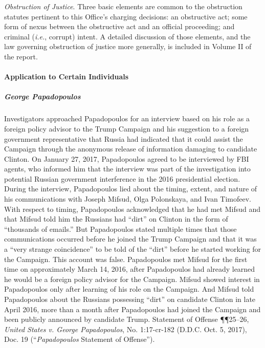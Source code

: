 \textit{Obstruction of Justice}.
Three basic elements are common to the obstruction statutes pertinent to this Office's charging decisions: an obstructive act; some form of nexus between the obstructive act and an official proceeding; and criminal (\textit{i.e.}, corrupt) intent.
A detailed discussion of those elements, and the law governing obstruction of justice more generally, is included in Volume II of the report.

\paragraph{Application to Certain Individuals}

\subparagraph{George Papadopoulos}
Investigators approached Papadopoulos for an interview based on his role as a foreign policy advisor to the Trump Campaign and his suggestion to a foreign government representative that Russia had indicated that it could assist the Campaign through the anonymous release of information damaging to candidate Clinton.
On January 27, 2017, Papadopoulos agreed to be interviewed by FBI agents, who informed him that the interview was part of the investigation into potential Russian government interference in the 2016 presidential election.
During the interview, Papadopoulos lied about the timing, extent, and nature of his communications with Joseph Mifsud, Olga Polonskaya, and Ivan Timofeev.
With respect to timing, Papadopoulos acknowledged that he had met Mifsud and that Mifsud told him the Russians had ``dirt'' on Clinton in the form of ``thousands of emails.''
But Papadopoulos stated multiple times that those communications occurred before he joined the Trump Campaign and that it was a ``very strange coincidence'' to be told of the ``dirt'' before he started working for the Campaign.
This account was false.
Papadopoulos met Mifsud for the first time on approximately March 14, 2016, after Papadopoulos had already learned he would be a foreign policy advisor for the Campaign.
Mifsud showed interest in Papadopoulos only after learning of his role on the Campaign.
And Mifsud told Papadopoulos about the Russians possessing ``dirt'' on candidate Clinton in late April 2016, more than a month after Papadopoulos had joined the Campaign and been publicly announced by candidate Trump.
Statement of Offense \P\P 25--26, \textit{United States v. George Papadopoulos}, No. 1:17-cr-182 (D.D.C. Oct. 5, 2017), Doc. 19 (``\textit{Papadopoulos} Statement of Offense'').

